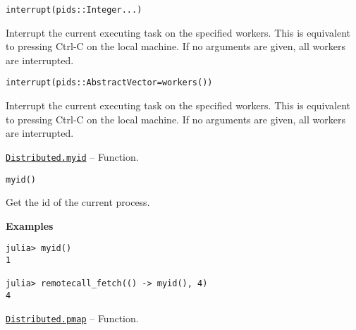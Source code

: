 \begin{adjustwidth}{2em}{0pt}


\begin{verbatim}
interrupt(pids::Integer...)
\end{verbatim}

Interrupt the current executing task on the specified workers. This is equivalent to pressing Ctrl-C on the local machine. If no arguments are given, all workers are interrupted.




\begin{lstlisting}
interrupt(pids::AbstractVector=workers())
\end{lstlisting}

Interrupt the current executing task on the specified workers. This is equivalent to pressing Ctrl-C on the local machine. If no arguments are given, all workers are interrupted.



\end{adjustwidth}
\hypertarget{15079655651797922234}{} 
\hyperlink{15079655651797922234}{\texttt{Distributed.myid}}  -- {Function.}

\begin{adjustwidth}{2em}{0pt}


\begin{verbatim}
myid()
\end{verbatim}

Get the id of the current process.

\textbf{Examples}


\begin{verbatim}
julia> myid()
1

julia> remotecall_fetch(() -> myid(), 4)
4
\end{verbatim}



\end{adjustwidth}
\hypertarget{9432281416771383761}{} 
\hyperlink{9432281416771383761}{\texttt{Distributed.pmap}}  -- {Function.}

